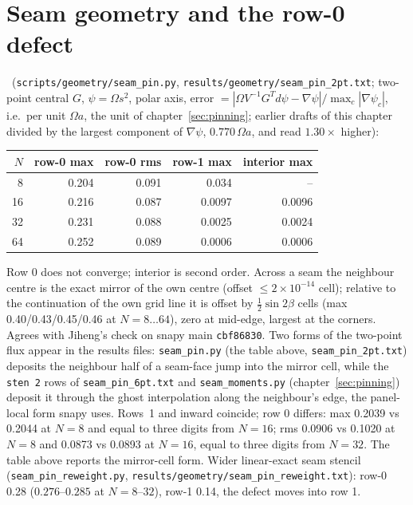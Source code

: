 \section{Seam geometry and the row-0 defect}\label{sec:seam}
\measured\ (\texttt{scripts/geometry/seam\_pin.py}, \texttt{results/geometry/seam\_pin\_2pt.txt}; two-point central
$G$, $\psi=\Omega s^2$, polar axis, error $=|\Omega V^{-1}G^T d\psi-\nabla\psi|/\max_c|\nabla\psi_c|$, i.e.\ per unit
$\Omega a$, the unit of chapter~\ref{sec:pinning}; earlier drafts of this chapter divided by the largest component of
$\nabla\psi$, $0.770\,\Omega a$, and read $1.30\times$ higher):
\begin{center}\begin{tabular}{rrrrr}\toprule
$N$ & row-0 max & row-0 rms & row-1 max & interior max\\\midrule
8 & 0.204 & 0.091 & 0.034 & --\\ 16 & 0.216 & 0.087 & 0.0097 & 0.0096\\
32 & 0.231 & 0.088 & 0.0025 & 0.0024\\ 64 & 0.252 & 0.089 & 0.0006 & 0.0006\\\bottomrule\end{tabular}\end{center}
Row 0 does not converge; interior is second order. Across a seam the neighbour centre is the exact mirror of the
own centre (offset $\le 2\times10^{-14}$ cell); relative to the continuation of the own grid line it is offset by
$\tfrac12\sin 2\beta$ cells (max 0.40/0.43/0.45/0.46 at $N=8\ldots64$), zero at mid-edge, largest at the corners.
Agrees with Jiheng's check on snapy main \texttt{cbf86830}. Two forms of the two-point flux appear in the results
files: \texttt{seam\_pin.py} (the table above, \texttt{seam\_pin\_2pt.txt}) deposits the neighbour half of a seam-face
jump into the mirror cell, while the \texttt{sten 2} rows of \texttt{seam\_pin\_6pt.txt} and \texttt{seam\_moments.py}
(chapter~\ref{sec:pinning}) deposit it through the ghost interpolation along the neighbour's edge, the panel-local form
snapy uses. Rows~1 and inward coincide; row 0 differs: max 0.2039 vs 0.2044 at $N=8$ and equal to three digits from
$N=16$; rms 0.0906 vs 0.1020 at $N=8$ and 0.0873 vs 0.0893 at $N=16$, equal to three digits from $N=32$. The table
above reports the mirror-cell form. Wider linear-exact seam stencil
(\texttt{seam\_pin\_reweight.py}, \texttt{results/geometry/seam\_pin\_reweight.txt}): row-0 0.28 ($0.276$--$0.285$ at
$N=8$--$32$), row-1 0.14, the defect moves into row 1.

